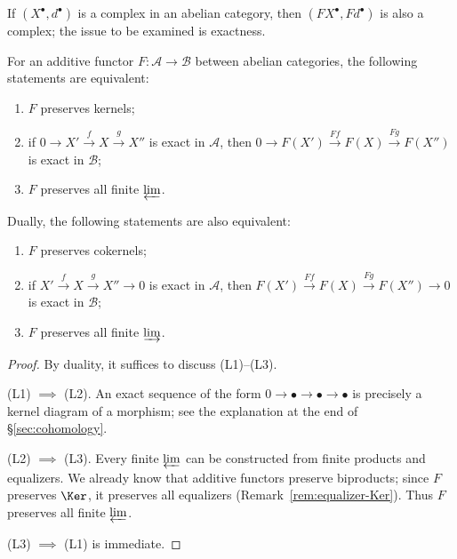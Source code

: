 If $(X^\bullet,d^\bullet)$ is a complex in an abelian category, then
$(FX^\bullet,Fd^\bullet)$ is also a complex; the issue to be examined is
exactness.

\begin{proposition}\label{prop:left-right-exact-functor}
For an additive functor $F:\mathcal{A}\to\mathcal{B}$ between abelian
categories, the following statements are equivalent:
\begin{enumerate}[(L1)]
	\item $F$ preserves kernels;
	\item if $0\to X'\xrightarrow{f}X\xrightarrow{g}X''$ is exact in
	$\mathcal{A}$, then
	$0\to F(X')\xrightarrow{Ff}F(X)\xrightarrow{Fg}F(X'')$ is exact in
	$\mathcal{B}$;
	\item $F$ preserves all finite $\varprojlim$.
\end{enumerate}
Dually, the following statements are also equivalent:
\begin{enumerate}[(R1)]
	\item $F$ preserves cokernels;
	\item if $X'\xrightarrow{f}X\xrightarrow{g}X''\to0$ is exact in
	$\mathcal{A}$, then
	$F(X')\xrightarrow{Ff}F(X)\xrightarrow{Fg}F(X'')\to0$ is exact in
	$\mathcal{B}$;
	\item $F$ preserves all finite $\varinjlim$.
\end{enumerate}
\end{proposition}

\begin{proof}
By duality, it suffices to discuss (L1)--(L3).

(L1) $\implies$ (L2). An exact sequence of the form
$0\to\bullet\to\bullet\to\bullet$ is precisely a kernel diagram of a
morphism; see the explanation at the end of \S\ref{sec:cohomology}.

(L2) $\implies$ (L3). Every finite $\varprojlim$ can be constructed from
finite products and equalizers. We already know that additive functors preserve
biproducts; since $F$ preserves $\Ker$, it preserves all equalizers
(Remark~\ref{rem:equalizer-Ker}). Thus $F$ preserves all finite
$\varprojlim$.

(L3) $\implies$ (L1) is immediate.
\end{proof}

